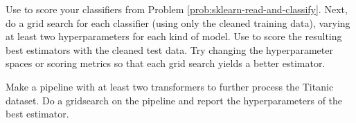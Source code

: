 \begin{problem}
Use  to score your classifiers from Problem \ref{prob:sklearn-read-and-classify}.
Next, do a grid search for each classifier (using only the cleaned training data), varying at least two hyperparameters for each kind of model.
Use  to score the resulting best estimators with the cleaned test data.
Try changing the hyperparameter spaces or scoring metrics so that each grid search yields a better estimator.
\end{problem}

\begin{problem}
Make a pipeline with at least two transformers to further process the Titanic dataset.
Do a gridsearch on the pipeline and report the hyperparameters of the best estimator.
\end{problem}
